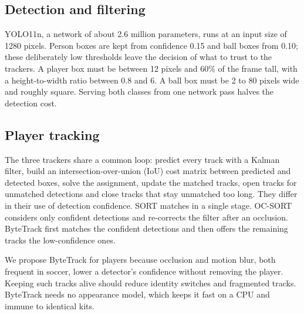 \documentclass[11pt,a4paper]{article}
\begin{document}
\subsection{Detection and filtering}
YOLO11n, a network of about 2.6 million parameters, runs at an input size of
1280 pixels. Person boxes are kept from confidence 0.15 and ball boxes from
0.10; these deliberately low thresholds leave the decision of what to trust to
the trackers. A player box must be between 12 pixels and 60\% of the frame
tall, with a height-to-width ratio between 0.8 and 6. A ball box must be 2 to 80
pixels wide and roughly square. Serving both classes from one network pass
halves the detection cost.

\subsection{Player tracking}
The three trackers share a common loop: predict every track with a Kalman
filter, build an intersection-over-union (IoU) cost matrix between predicted and
detected boxes, solve the assignment, update the matched tracks, open tracks
for unmatched detections and close tracks that stay unmatched too long. They
differ in their use of detection confidence. SORT matches in a single stage.
OC-SORT considers only confident detections and re-corrects the filter after an
occlusion. ByteTrack first matches the confident detections and then offers the
remaining tracks the low-confidence ones.

We propose ByteTrack for players because occlusion and motion blur, both
frequent in soccer, lower a detector's confidence without removing the player.
Keeping such tracks alive should reduce identity switches and fragmented tracks.
ByteTrack needs no appearance model, which keeps it fast on a CPU and immune to
identical kits.
\end{document}
